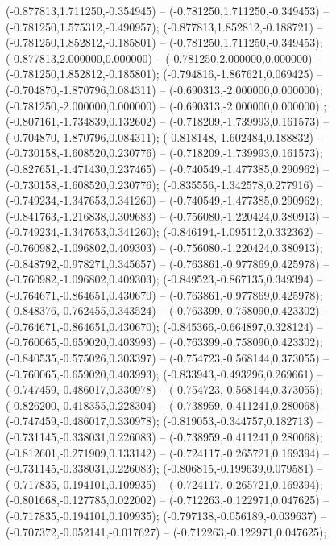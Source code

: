  (-0.877813,1.711250,-0.354945) -- (-0.781250,1.711250,-0.349453) -- (-0.781250,1.575312,-0.490957);
 (-0.877813,1.852812,-0.188721) -- (-0.781250,1.852812,-0.185801) -- (-0.781250,1.711250,-0.349453);
 (-0.877813,2.000000,0.000000) -- (-0.781250,2.000000,0.000000) -- (-0.781250,1.852812,-0.185801);
 (-0.794816,-1.867621,0.069425) -- (-0.704870,-1.870796,0.084311) -- (-0.690313,-2.000000,0.000000);
 (-0.781250,-2.000000,0.000000) -- (-0.690313,-2.000000,0.000000) ;
 (-0.807161,-1.734839,0.132602) -- (-0.718209,-1.739993,0.161573) -- (-0.704870,-1.870796,0.084311);
 (-0.818148,-1.602484,0.188832) -- (-0.730158,-1.608520,0.230776) -- (-0.718209,-1.739993,0.161573);
 (-0.827651,-1.471430,0.237465) -- (-0.740549,-1.477385,0.290962) -- (-0.730158,-1.608520,0.230776);
 (-0.835556,-1.342578,0.277916) -- (-0.749234,-1.347653,0.341260) -- (-0.740549,-1.477385,0.290962);
 (-0.841763,-1.216838,0.309683) -- (-0.756080,-1.220424,0.380913) -- (-0.749234,-1.347653,0.341260);
 (-0.846194,-1.095112,0.332362) -- (-0.760982,-1.096802,0.409303) -- (-0.756080,-1.220424,0.380913);
 (-0.848792,-0.978271,0.345657) -- (-0.763861,-0.977869,0.425978) -- (-0.760982,-1.096802,0.409303);
 (-0.849523,-0.867135,0.349394) -- (-0.764671,-0.864651,0.430670) -- (-0.763861,-0.977869,0.425978);
 (-0.848376,-0.762455,0.343524) -- (-0.763399,-0.758090,0.423302) -- (-0.764671,-0.864651,0.430670);
 (-0.845366,-0.664897,0.328124) -- (-0.760065,-0.659020,0.403993) -- (-0.763399,-0.758090,0.423302);
 (-0.840535,-0.575026,0.303397) -- (-0.754723,-0.568144,0.373055) -- (-0.760065,-0.659020,0.403993);
 (-0.833943,-0.493296,0.269661) -- (-0.747459,-0.486017,0.330978) -- (-0.754723,-0.568144,0.373055);
 (-0.826200,-0.418355,0.228304) -- (-0.738959,-0.411241,0.280068) -- (-0.747459,-0.486017,0.330978);
 (-0.819053,-0.344757,0.182713) -- (-0.731145,-0.338031,0.226083) -- (-0.738959,-0.411241,0.280068);
 (-0.812601,-0.271909,0.133142) -- (-0.724117,-0.265721,0.169394) -- (-0.731145,-0.338031,0.226083);
 (-0.806815,-0.199639,0.079581) -- (-0.717835,-0.194101,0.109935) -- (-0.724117,-0.265721,0.169394);
 (-0.801668,-0.127785,0.022002) -- (-0.712263,-0.122971,0.047625) -- (-0.717835,-0.194101,0.109935);
 (-0.797138,-0.056189,-0.039637) -- (-0.707372,-0.052141,-0.017627) -- (-0.712263,-0.122971,0.047625);
